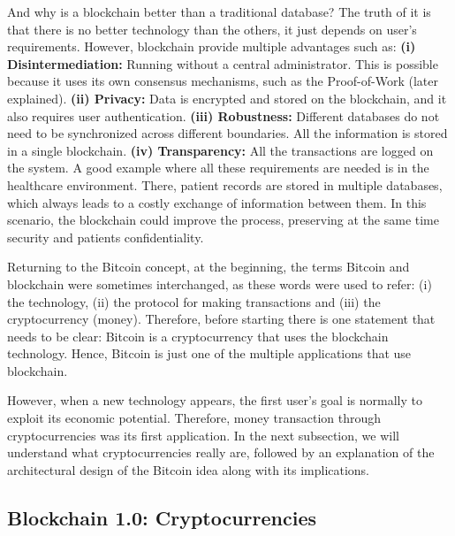And why is a blockchain better than a traditional database? The truth of it is that there is no better technology than the others, it just depends on user's requirements. However, blockchain provide multiple advantages such as: \newline
\textbf{(i) Disintermediation:} Running without a central administrator. This is possible because it uses its own consensus mechanisms, such as the Proof-of-Work (later explained). \newline
\textbf{(ii) Privacy:} Data is encrypted and stored on the blockchain, and it also requires user authentication. \newline
\textbf{(iii) Robustness:} Different databases do not need to be synchronized across different boundaries. All the information is stored in a single blockchain. \newline 
\textbf{(iv) Transparency:} All the transactions are logged on the system. \newline 
A good example where all these requirements are needed is in the healthcare environment. There, patient records are stored in multiple databases, which always leads to a costly exchange of information between them. In this scenario, the blockchain could improve the process, preserving at the same time security and patients confidentiality.


Returning to the Bitcoin concept, at the beginning, the terms Bitcoin and blockchain were sometimes interchanged, as these words were used to refer: (i) the technology, (ii) the protocol for making transactions and (iii) the cryptocurrency (money). Therefore, before starting there is one statement that needs to be clear: Bitcoin is a cryptocurrency that uses the blockchain technology. Hence, Bitcoin is just one of the multiple applications that use blockchain. 

However, when a new technology appears, the first user's goal is normally to exploit its economic potential. Therefore, money transaction through cryptocurrencies was its first application. In the next subsection, we will understand what cryptocurrencies really are, followed by an explanation of the architectural design of the Bitcoin idea along with its implications.

\subsection{Blockchain 1.0: Cryptocurrencies}

